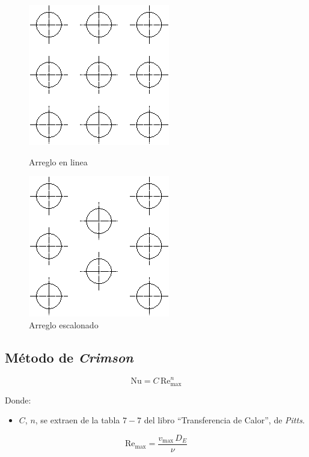 \begin{figure}[!h]
\centering
    \begin{minipage}{.4\textwidth}
        \centering
        \includegraphics[scale=1.00]{figura05_04.eps}
        \caption{Arreglo en linea}
    \end{minipage}
    \begin{minipage}{.4\textwidth}
        \centering
        \includegraphics[scale=1.00]{figura05_05.eps}
        \caption{Arreglo escalonado}
    \end{minipage}
\end{figure}

\subsection{Método de \emph{Crimson}}
\begin{equation}
    \text{Nu} = C\,\text{Re}_\text{max}^n
\end{equation}

Donde:
\begin{itemize}
    \item $C$, $n$, se extraen de la tabla $7-7$ del libro ``Transferencia de
        Calor'', de \emph{Pitts}.
\end{itemize}

\begin{equation}
    \text{Re}_\text{max} = \frac{v_\text{max}\,D_E}{\nu}
\end{equation}

